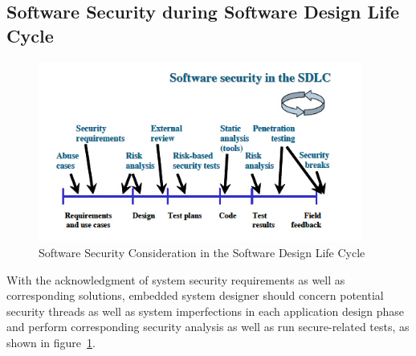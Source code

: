 \subsection{Software Security during Software Design Life Cycle}
\begin{figure}[!htb]
	\centering
	\includegraphics[width=0.95\textwidth]{sdlc.jpg}
		\caption{Software Security Consideration in the Software  Design Life  Cycle \cite{embedded_secure}}
	\label{fig:sdlc}
\end{figure}
With the acknowledgment of system security requirements as well as corresponding solutions, embedded system designer should concern potential security threads as well as system imperfections in each application design phase and perform corresponding security analysis as well as run secure-related tests, as shown in figure~\ref{fig:sdlc}.

